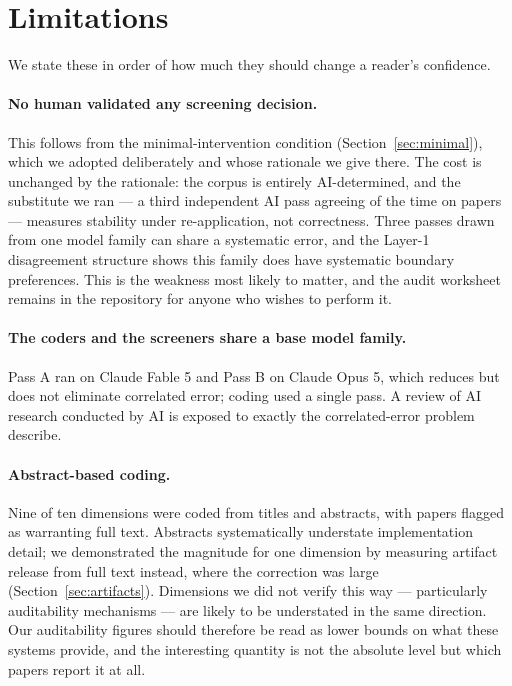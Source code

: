 \section{Limitations}
\label{sec:limits}

We state these in order of how much they should change a reader's confidence.

\paragraph{No human validated any screening decision.} This follows from the
minimal-intervention condition (Section~\ref{sec:minimal}), which we adopted deliberately and
whose rationale we give there. The cost is unchanged by the rationale: the corpus is entirely
AI-determined, and the substitute we ran --- a third independent AI pass agreeing
\consAgree{} of the time on \nCons{} papers --- measures stability under re-application, not
correctness. Three passes drawn from one model family can share a systematic error, and the
Layer-1 disagreement structure shows this family does have systematic boundary preferences.
This is the weakness most likely to matter, and the audit worksheet remains in the repository
for anyone who wishes to perform it.

\paragraph{The coders and the screeners share a base model family.} Pass A ran on Claude
Fable 5 and Pass B on Claude Opus 5, which reduces but does not eliminate correlated error;
coding used a single pass. A review of AI research conducted by AI is exposed to exactly the
correlated-error problem \citet{bowkis2026automated} describe.

\paragraph{Abstract-based coding.} Nine of ten dimensions were coded from titles and
abstracts, with \nNeedsFulltext{} papers flagged as warranting full text. Abstracts
systematically understate implementation detail; we demonstrated the magnitude for one
dimension by measuring artifact release from full text instead, where the correction was
large (Section~\ref{sec:artifacts}). Dimensions we did not verify this way --- particularly
auditability mechanisms --- are likely to be understated in the same direction. Our
auditability figures should therefore be read as lower bounds on what these systems provide,
and the interesting quantity is not the absolute level but which papers report it at all.

